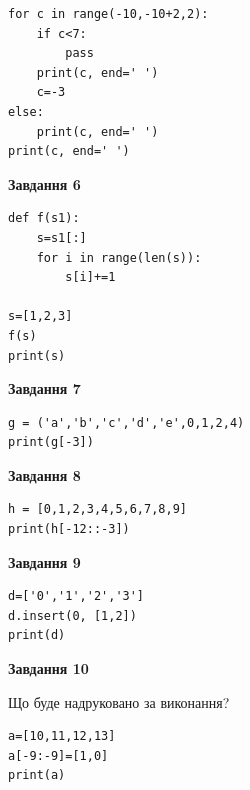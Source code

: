 \documentclass[12pt, ukrainian]{article}
\begin{document}
{{{{{{{{{{{{{{{{{\begin{minipage}[t]{10.5cm}
\begin{verbatim}
for c in range(-10,-10+2,2):
    if c<7:
        pass
    print(c, end=' ')
    c=-3
else:
    print(c, end=' ')
print(c, end=' ')
\end{verbatim}



\begin{center}
\textbf{Завдання 6}
\end{center}

\begin{verbatim}
def f(s1):
    s=s1[:]
    for i in range(len(s)):
        s[i]+=1

s=[1,2,3]
f(s)
print(s)
\end{verbatim}



\begin{center}
\textbf{Завдання 7}
\end{center}

\begin{verbatim}
g = ('a','b','c','d','e',0,1,2,4)
print(g[-3])
\end{verbatim}



\begin{center}
\textbf{Завдання 8}
\end{center}

\begin{verbatim}
h = [0,1,2,3,4,5,6,7,8,9]
print(h[-12::-3])
\end{verbatim}



\begin{center}
\textbf{Завдання 9}
\end{center}

\begin{verbatim}
d=['0','1','2','3']
d.insert(0, [1,2])
print(d)
\end{verbatim}



\begin{center}
\textbf{Завдання 10}
\end{center}
Що буде надруковано за виконання?\par
\begin{verbatim}
a=[10,11,12,13]
a[-9:-9]=[1,0]
print(a)
\end{verbatim}

\end{minipage}

}
\newpage

}}}}}}}}}}}}}}}}
\end{document}
